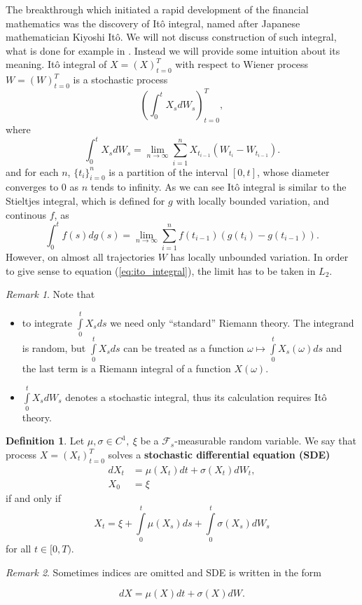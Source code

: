 \documentclass[a4paper,11pt, twoside]{book}
\theoremstyle{definition}
\newtheorem{mydef}{Definition}[chapter]
\theoremstyle{remark}
\newtheorem{remark}{Remark}[chapter]
\begin{document}
The breakthrough which initiated a rapid development of the financial mathematics was the discovery of It\^{o} integral, named after Japanese mathematician Kiyoshi It\^{o}. We will not discuss construction of such integral, what is done for example in \cite{latala}.
Instead we will provide some intuition about its meaning. It\^{o} integral of $X=(X)_{t=0}^T$ with respect to Wiener process $W=(W)_{t=0}^T$ is a stochastic process
\[ \left( \int_0^{t} X_s dW_s \right)_{t = 0}^T, \]
where
\begin{equation}
 \label{eq:ito_integral}
  \int_0^{t} X_s dW_s = \lim_{n \rightarrow \infty} \sum\limits_{i=1}^n X_{t_{i-1}} (W_{t_i} - W_{t_{i-1}}).
\end{equation}
and for each $n$, $\{t_i\}_{i=0}^n$ is a partition of the interval $[0,t]$, whose diameter converges to 0 as $n$ tends to infinity.
As we can see It\^{o} integral is similar to the Stieltjes integral, which is defined for $g$ with locally bounded variation, and continous $f$, as
\[  \int_0^{t} f(s) dg(s) = \lim_{n \rightarrow \infty} \sum\limits_{i=1}^n f(t_{i-1}) (g(t_i) - g(t_{i-1})). \]
However, on almost all trajectories $W$ has locally unbounded variation. In order to give sense to equation (\ref{eq:ito_integral}), the limit has to be taken in $L_2$.

\begin{remark} Note that
\begin{itemize}
 \item to integrate $\int\limits_0^t X_s ds$ we need only ``standard'' Riemann theory. The integrand is random, but $\int\limits_0^t X_s ds$ can be treated as a function $\omega \mapsto \int\limits_0^t X_s(\omega) ds$ and the last term is a Riemann integral of a function $X(\omega)$.
 \item $\int\limits_0^t X_s dW_s$ denotes a stochastic integral, thus its calculation requires It\^{o} theory.
\end{itemize}
\end{remark}


\begin{mydef}
\label{def:SDE}
 Let $\mu, \sigma \in C^1,\ \xi$ be a $\mathcal{F}_s$-measurable random variable. We say that process $X=(X_t)_{t=0}^T$ solves a \textbf{stochastic differential equation (SDE)}
 \begin{equation*}
 \begin{split}
   dX_t &= \mu(X_t)dt + \sigma(X_t) dW_t,\\
   X_0 &= \xi  
 \end{split}  
 \end{equation*}
 if and only if
 \[X_t = \xi + \int\limits_0^t \mu(X_s)ds + \int\limits_0^t\sigma(X_s) dW_s\]
for all $t \in [0,T)$.
\end{mydef}
\begin{remark}
 Sometimes indices are omitted and SDE is written in the form
\end{remark}
\[ dX = \mu(X)dt + \sigma(X) dW. \]
\end{document}

